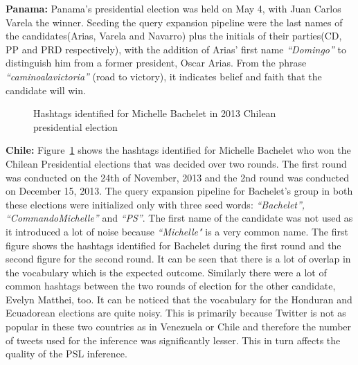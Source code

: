 \noindent
{\bf Panama:}
Panama's presidential election was held on May 4, with Juan Carlos Varela the winner. Seeding the query expansion pipeline were the last names of the candidates(Arias, Varela and Navarro) plus the initials of their parties(CD, PP and PRD respectively), with the addition of Arias' first name \emph{``Domingo''} to distinguish him from a former president, Oscar Arias. From the phrase \emph{``caminoalavictoria''} (road to victory), it indicates belief and faith that the candidate will win.

\begin{figure}
	\centering
	\caption{Hashtags identified for Michelle Bachelet in 2013 Chilean presidential election} 
	\label{fig:bacheletwordCloud}
\end{figure}

\noindent
{\bf Chile:}
Figure~\ref{fig:bacheletwordCloud} shows the hashtags identified for Michelle Bachelet who won the Chilean Presidential elections that was decided over two rounds.
The first round was conducted on the 24th of November, 2013 and the 2nd round was conducted on December 15, 2013. 
The query expansion pipeline for Bachelet's group in both these elections were initialized only with three seed words: {\emph{``Bachelet'', ``CommandoMichelle''} and \emph{``PS''}}. 
The first name of the candidate was not used as it introduced a lot of noise because \emph{``Michelle"} is a very common name.
The first figure shows the hashtags identified for Bachelet during the first round and the second figure for the second round. 
It can be seen that there is a lot of overlap in the vocabulary which is the expected outcome. 
Similarly there were a lot of common hashtags between the two rounds of election for the other candidate, Evelyn Matthei, too.
It can be noticed that the vocabulary for the Honduran and Ecuadorean  elections are quite noisy. 
This is primarily because Twitter is not as popular in these two countries as in Venezuela or Chile and therefore the number of tweets
used for the inference was significantly lesser.
This in turn affects the quality of the PSL inference.


